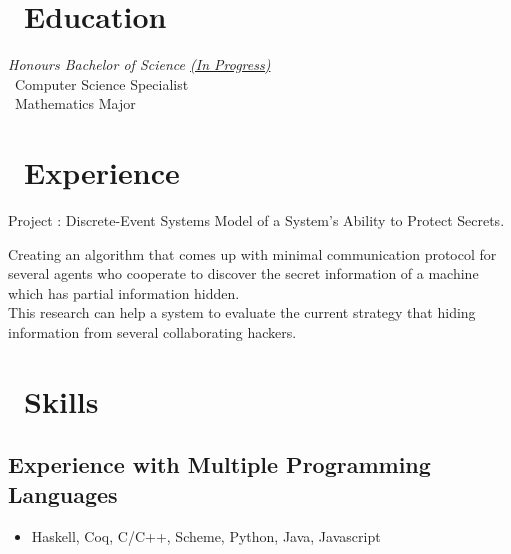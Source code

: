 \documentclass{resume}
\begin{document}




\section{\faGraduationCap\ Education}
\textit{Honours Bachelor of Science \underline{(In Progress)}} 
\\ \textperiodcentered\  Computer Science Specialist 
\\ \textperiodcentered\  Mathematics Major

\section{\faUsers\ Experience}
 {}
Project : Discrete-Event Systems Model of a System's Ability to Protect Secrets.

Creating an algorithm that comes up with minimal communication protocol 
for several agents who cooperate to discover the secret information of a machine 
which has partial information hidden. \\
This research can help a system to evaluate the current strategy 
that hiding information from several collaborating hackers.





\section{\faCogs\ Skills}
\subsection{\textbf{Experience with Multiple Programming Languages}}
\begin{itemize}
 \item Haskell, Coq, C/C++, Scheme, Python, Java, Javascript
\end{itemize}
\end{document}
